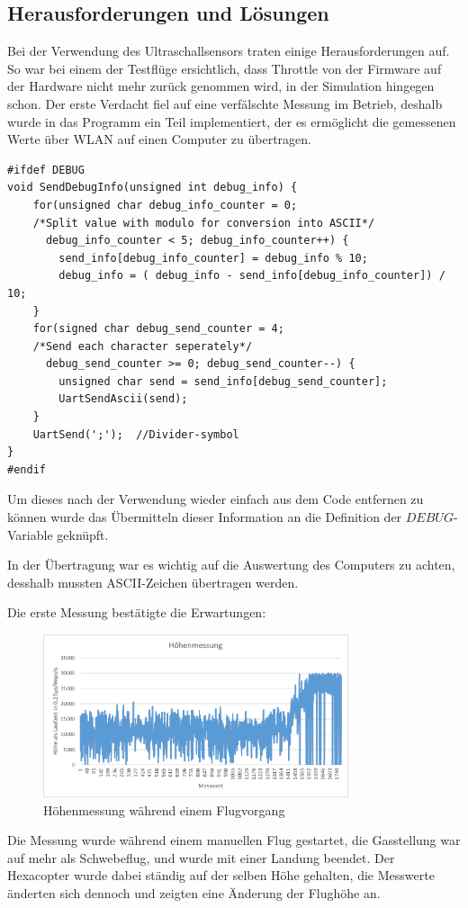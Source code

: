   \subsection{Herausforderungen und Lösungen}
  Bei der Verwendung des Ultraschallsensors traten einige Herausforderungen auf. So war bei einem der Testflüge ersichtlich, dass Throttle von der Firmware auf der Hardware nicht mehr
  zurück genommen wird, in der Simulation hingegen schon. Der erste Verdacht fiel auf eine verfälschte Messung im Betrieb, deshalb wurde in das Programm ein Teil implementiert, der
  es ermöglicht die gemessenen Werte über WLAN auf einen Computer zu übertragen.
  \lstset{language = c}
  \begin{lstlisting}
#ifdef DEBUG
void SendDebugInfo(unsigned int debug_info) {
    for(unsigned char debug_info_counter = 0;
    /*Split value with modulo for conversion into ASCII*/
      debug_info_counter < 5; debug_info_counter++) {
        send_info[debug_info_counter] = debug_info % 10;
        debug_info = ( debug_info - send_info[debug_info_counter]) / 10;
    }
    for(signed char debug_send_counter = 4;
    /*Send each character seperately*/
      debug_send_counter >= 0; debug_send_counter--) {
        unsigned char send = send_info[debug_send_counter];
        UartSendAscii(send);
    }
    UartSend(';');  //Divider-symbol
}
#endif
  \end{lstlisting}

  Um dieses nach der Verwendung wieder einfach aus dem Code entfernen zu können wurde das Übermitteln dieser Information an die Definition der $DEBUG$-Variable geknüpft.

  In der Übertragung war es wichtig auf die Auswertung des Computers zu achten, desshalb mussten ASCII-Zeichen übertragen werden.

  Die erste Messung bestätigte die Erwartungen:
  \begin{figure}[H]
    \begin{centering}
      \includegraphics[width = 0.8\textwidth]{Bilder/Hoehenmessung}
    \par\end{centering}
    \caption{Höhenmessung während einem Flugvorgang}
    \label{Hoehenmessung}
  \end{figure}
  Die Messung wurde während einem manuellen Flug gestartet, die Gasstellung war auf mehr als Schwebeflug, und wurde mit einer Landung beendet. Der Hexacopter wurde dabei ständig
  auf der selben Höhe gehalten, die Messwerte änderten sich dennoch und zeigten eine Änderung der Flughöhe an.

